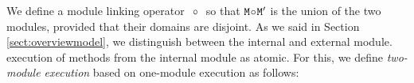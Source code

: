 %

  
  

\subsubsection{}

We define a module linking operator \  $\!\circ\!$ \  so that
${\mbox{\tt{\ensuremath{{\mbox{\tt{M}}}}}}}\!\circ\!{\mbox{\tt{\ensuremath{{\mbox{\tt{M}}}}}}}'$ is the union of the two modules, provided that their domains are disjoint.
As we said in Section \ref{sect:overviewmodel}, we distinguish  between the internal and external module.   execution of 
methods from the internal module as atomic. For this, we define \emph{two-module execution}  based on
one-module execution as follows:

